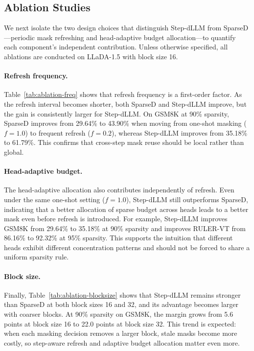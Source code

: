 \subsection{Ablation Studies}

We next isolate the two design choices that distinguish Step-dLLM from SparseD---periodic mask refreshing and head-adaptive budget allocation---to quantify each component's independent contribution. Unless otherwise specified, all ablations are conducted on LLaDA-1.5 with block size 16.

\paragraph{Refresh frequency.}
Table~\ref{tab:ablation-freq} shows that refresh frequency is a first-order factor. As the refresh interval becomes shorter, both SparseD and Step-dLLM improve, but the gain is consistently larger for Step-dLLM. On GSM8K at 90\% sparsity, SparseD improves from 29.64\% to 43.90\% when moving from one-shot masking ($f{=}1.0$) to frequent refresh ($f{=}0.2$), whereas Step-dLLM improves from 35.18\% to 61.79\%. This confirms that cross-step mask reuse should be local rather than global.

\paragraph{Head-adaptive budget.}
The head-adaptive allocation also contributes independently of refresh. Even under the same one-shot setting ($f{=}1.0$), Step-dLLM still outperforms SparseD, indicating that a better allocation of sparse budget across heads leads to a better mask even before refresh is introduced. For example, Step-dLLM improves GSM8K from 29.64\% to 35.18\% at 90\% sparsity and improves RULER-VT from 86.16\% to 92.32\% at 95\% sparsity. This supports the intuition that different heads exhibit different concentration patterns and should not be forced to share a uniform sparsity rule.

\paragraph{Block size.}
Finally, Table~\ref{tab:ablation-blocksize} shows that Step-dLLM remains stronger than SparseD at both block sizes 16 and 32, and its advantage becomes larger with coarser blocks. At 90\% sparsity on GSM8K, the margin grows from 5.6 points at block size 16 to 22.0 points at block size 32. This trend is expected: when each masking decision removes a larger block, stale masks become more costly, so step-aware refresh and adaptive budget allocation matter even more.



